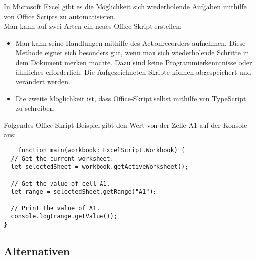 In Microsoft Excel gibt es die Möglichkeit sich wiederholende Aufgaben mithilfe 
von Office Scripts zu automatisieren.
\\
Man kann auf zwei Arten ein neues Office-Skript erstellen:
\begin{itemize}
    \item Man kann seine Handlungen mithilfe des Actionrecorders aufnehmen. 
    Diese Methode eignet sich besonders gut, wenn man sich wiederholende 
    Schritte in dem Dokument merken möchte. Dazu sind keine Programmierkenntnisse 
    oder ähnliches erforderlich. Die Aufgezeichneten Skripte können 
    abgespeichert und verändert werden.
    \item Die zweite Möglichkeit ist, dass Office-Skript selbst mithilfe 
    von TypeScript zu schreiben.
\end{itemize}

Folgendes Office-Skript Beispiel gibt den Wert von der Zelle A1 auf der Konsole aus:

\begin{lstlisting}
    function main(workbook: ExcelScript.Workbook) {
  // Get the current worksheet.
  let selectedSheet = workbook.getActiveWorksheet();

  // Get the value of cell A1.
  let range = selectedSheet.getRange("A1");
  
  // Print the value of A1.
  console.log(range.getValue());
}
\end{lstlisting}

\newpage

\subsection*{Alternativen}